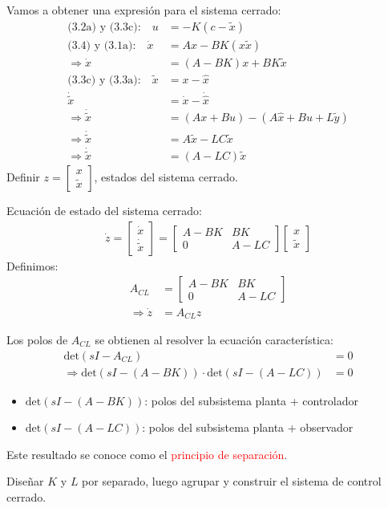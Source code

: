 Vamos a obtener una expresión para el sistema cerrado:
\begin{align}
    \text{(3.2a) y (3.3c):} \quad u&=-K(c-\tilde{x})\\
    \text{(3.4) y (3.1a):} \quad \dot{x} &= Ax-BK(x\tilde{x})\\
    \Longrightarrow \dot{x} &= (A-BK)x+BK\tilde{x}\\
    \text{(3.3c) y (3.3a):} \quad \tilde{x} &= x-\hat{x}\\
    \dot{\tilde{x}} &= \dot{x}-\dot{\hat{x}}\\
    \Longrightarrow \dot{\tilde{x}} &= (Ax+Bu)-(A\hat{x}+Bu+L\tilde{y})\\
    \Longrightarrow \dot{\tilde{x}} &= A\tilde{x}-LC \tilde{x}\\
    \Longrightarrow \dot{\tilde{x}} &= (A-LC)\tilde{x}
\end{align}
Definir $z=\left[
    \begin{array}{c}
     x \\ \tilde{x} 
    \end{array}\right]$, estados del sistema cerrado.\\
\par Ecuación de estado del sistema cerrado:
\begin{align*}
    \dot{z}=\left[
    \begin{array}{c}
     \dot{x} \\ \dot{\tilde{x}} 
    \end{array}\right] = \left[
    \begin{array}{cc}
     A-BK & BK \\ 0 & A-LC 
    \end{array}\right]\left[
    \begin{array}{c}
     x \\ \tilde{x} 
    \end{array}\right]
\end{align*}
Definimos:
\begin{align*}
    A_{CL} &= \left[
    \begin{array}{cc}
     A-BK & BK \\ 0 & A-LC 
    \end{array}\right]\\
    \Longrightarrow \dot{z}&=A_{CL}z
\end{align*}

Los polos de $A_{CL}$ se obtienen al resolver la ecuación característica:
\begin{align*}
    \text{det}(sI-A_{CL})&=0\\
    \Longrightarrow \text{det}(sI-(A-BK))\cdot\text{det}(sI-(A-LC)) &=0
\end{align*}
\begin{itemize}
    \item $\text{det}(sI-(A-BK))$: polos del subsistema planta + controlador
    \item $\text{det}(sI-(A-LC))$: polos del subsistema planta + observador 
\end{itemize}

Este resultado se conoce como el \textcolor{red}{principio de separación}.\\
\par Diseñar $K$ y $L$ por separado, luego agrupar y construir el sistema de control cerrado.


